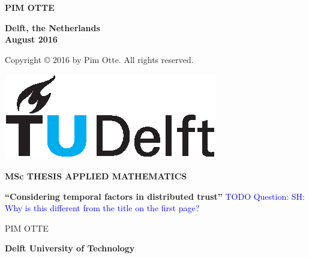 \documentclass[a4paper,11pt]{book}
\newcommand\question[1]{\textcolor{blue}{TODO Question: #1}}
\theoremstyle{definition}
\begin{document}
\begin{titlepage}
\begin{center}
\vspace{1cm}

\textbf{PIM OTTE}\\


\textbf{Delft, the Netherlands \\
August 2016} \\

\vspace{1cm}

Copyright \copyright{} 2016 by Pim Otte. All rights reserved.
\end{center}

\end{titlepage}

\newpage

\thispagestyle{empty}

\quad

\newpage

\thispagestyle{empty}

\hspace{10cm}
\begin{minipage}{5cm}
  \includegraphics{tudelft.eps}
\end{minipage}

\begin{center}

\textbf{\large{MSc THESIS APPLIED MATHEMATICS}}

\vspace{1.5cm}

\textbf{``Considering temporal factors in distributed trust''}
\question{SH: Why is this different from the title on the first page?}

\vspace{1.5cm}

PIM OTTE\\

\vspace{1.5cm}

\textbf{\large{Delft University of Technology}}


\end{center}
\end{document}
